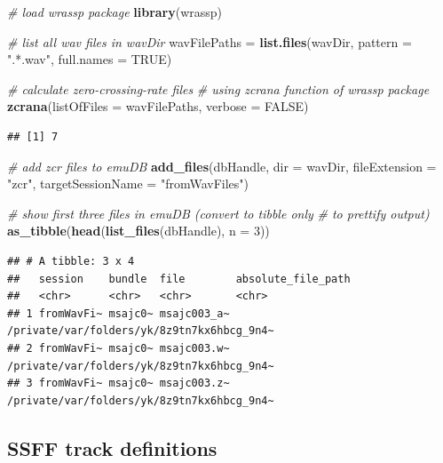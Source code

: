 \documentclass[]{book}
\newenvironment{Shaded}{\begin{snugshade}}{\end{snugshade}}
\newcommand{\CommentTok}[1]{\textcolor[rgb]{0.56,0.35,0.01}{\textit{#1}}}
\newcommand{\DataTypeTok}[1]{\textcolor[rgb]{0.13,0.29,0.53}{#1}}
\newcommand{\DecValTok}[1]{\textcolor[rgb]{0.00,0.00,0.81}{#1}}
\newcommand{\KeywordTok}[1]{\textcolor[rgb]{0.13,0.29,0.53}{\textbf{#1}}}
\newcommand{\NormalTok}[1]{#1}
\newcommand{\OtherTok}[1]{\textcolor[rgb]{0.56,0.35,0.01}{#1}}
\newcommand{\StringTok}[1]{\textcolor[rgb]{0.31,0.60,0.02}{#1}}
\begin{document}
\begin{Shaded}
\begin{Highlighting}[]
\CommentTok{# load wrassp package}
\KeywordTok{library}\NormalTok{(wrassp)}

\CommentTok{# list all wav files in wavDir}
\NormalTok{wavFilePaths =}\StringTok{ }\KeywordTok{list.files}\NormalTok{(wavDir,}
                          \DataTypeTok{pattern =} \StringTok{".*.wav"}\NormalTok{,}
                          \DataTypeTok{full.names =} \OtherTok{TRUE}\NormalTok{)}

\CommentTok{# calculate zero-crossing-rate files}
\CommentTok{# using zcrana function of wrassp package}
\KeywordTok{zcrana}\NormalTok{(}\DataTypeTok{listOfFiles =}\NormalTok{ wavFilePaths,}
       \DataTypeTok{verbose =} \OtherTok{FALSE}\NormalTok{)}
\end{Highlighting}
\end{Shaded}

\begin{verbatim}
## [1] 7
\end{verbatim}

\begin{Shaded}
\begin{Highlighting}[]
\CommentTok{# add zcr files to emuDB}
\KeywordTok{add_files}\NormalTok{(dbHandle,}
          \DataTypeTok{dir =}\NormalTok{ wavDir,}
          \DataTypeTok{fileExtension =} \StringTok{"zcr"}\NormalTok{,}
          \DataTypeTok{targetSessionName =} \StringTok{"fromWavFiles"}\NormalTok{)}

\CommentTok{# show first three files in emuDB (convert to tibble only}
\CommentTok{# to prettify output)}
\KeywordTok{as_tibble}\NormalTok{(}\KeywordTok{head}\NormalTok{(}\KeywordTok{list_files}\NormalTok{(dbHandle), }\DataTypeTok{n =} \DecValTok{3}\NormalTok{))}
\end{Highlighting}
\end{Shaded}

\begin{verbatim}
## # A tibble: 3 x 4
##   session    bundle  file        absolute_file_path                        
##   <chr>      <chr>   <chr>       <chr>                                     
## 1 fromWavFi~ msajc0~ msajc003_a~ /private/var/folders/yk/8z9tn7kx6hbcg_9n4~
## 2 fromWavFi~ msajc0~ msajc003.w~ /private/var/folders/yk/8z9tn7kx6hbcg_9n4~
## 3 fromWavFi~ msajc0~ msajc003.z~ /private/var/folders/yk/8z9tn7kx6hbcg_9n4~
\end{verbatim}

\hypertarget{ssff-track-definitions}{%
\subsection{SSFF track definitions}\label{ssff-track-definitions}}
\end{document}
